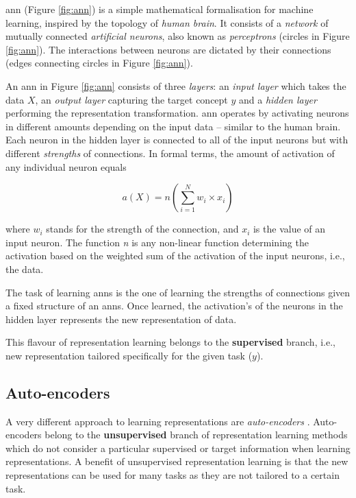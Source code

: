 \gls{ann} (Figure \ref{fig:ann}) is a simple mathematical formalisation for machine learning, inspired by the topology of  \textit{human brain}.
It consists of a \textit{network} of mutually connected \textit{artificial neurons}, also known as \textit{perceptrons} (circles in Figure \ref{fig:ann}).
The interactions between neurons are dictated by their connections (edges connecting circles in Figure \ref{fig:ann}).




An \gls{ann} in Figure \ref{fig:ann} consists of three \textit{layers}: an \textit{input layer} which takes the data $X$, an \textit{output layer} capturing the target concept $y$ and a \textit{hidden layer} performing the representation transformation.
\gls{ann} operates by activating neurons in different amounts depending on the input data -- similar to the human brain.
Each neuron in the hidden layer is connected to all of the input neurons but with different \textit{strengths} of connections.
In formal terms, the amount of activation of any individual neuron equals

\begin{equation}
	a(X) = n(\sum_{i=1}^N w_i \times x_i)
\end{equation}

where $w_i$ stands for the strength of the connection, and $x_i$ is the value of an input neuron.
The function \textit{n} is any non-linear function determining the activation based on the weighted sum of the activation of the input neurons, i.e., the data.




The task of learning \gls{ann}s is the one of learning the strengths of connections given a fixed structure of an \gls{ann}s.
Once learned, the activation's of the neurons in the hidden layer represents the new representation of data.


This flavour of representation learning belongs to the \textbf{supervised} branch, i.e.,  new representation tailored specifically for the given task ($y$).




\subsection{Auto-encoders}


A very different approach to learning representations are \textit{auto-encoders} \cite{Hinton504}.
Auto-encoders belong to the \textbf{unsupervised} branch of representation learning methods which do not consider a particular supervised or target information when learning representations.
A benefit of unsupervised representation learning is that the new representations can be used for many tasks as they are not tailored to a certain task.



